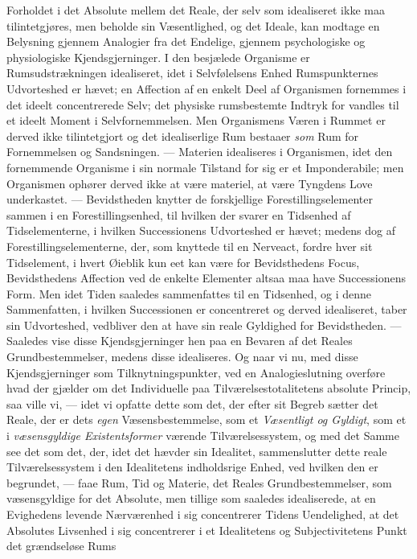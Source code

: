 Forholdet i det Absolute mellem det Reale, der selv som idealiseret ikke maa
tilintetgjøres, men beholde sin Væsentlighed, og det Ideale, kan modtage en
Belysning gjennem Analogier fra det Endelige, gjennem psychologiske og
physiologiske Kjendsgjerninger. I den besjælede Organisme er
Rumsudstrækningen idealiseret, idet i Selvfølelsens Enhed Rumspunkternes
Udvorteshed er hævet; en Affection af en enkelt Deel af Organismen fornemmes i
det ideelt concentrerede Selv; det physiske rumsbestemte Indtryk for\-%
vandles til et ideelt Moment i Selvfornemmelsen. Men Organismens Væren i Rummet
er derved ikke tilintetgjort og det idealiserlige Rum bestaaer \emph{som} Rum
for Fornemmelsen og Sandsningen. --- Materien idealiseres i Organismen, idet
den fornemmende Organisme i sin normale Tilstand for sig er et Imponderabile;
men Organismen ophører derved ikke at være materiel, at være Tyngdens Love
underkastet. --- Bevidstheden knytter de forskjellige Forestillingselementer
sammen i en Forestillingsenhed, til hvilken der svarer en Tidsenhed af
Tidselementerne, i hvilken Successionens Udvorteshed er hævet; medens dog af
Forestillingselementerne, der, som knyttede til en Nerveact, fordre hver sit
Tidselement, i hvert Øieblik kun eet kan være for Bevidsthedens Focus,
Bevidsthedens Affection ved de enkelte Elementer altsaa maa have Successionens
Form. Men idet Tiden saaledes sammenfattes til en Tidsenhed, og i denne
Sammenfatten, i hvilken Successionen er concentreret og derved idealiseret,
taber sin Udvorteshed, vedbliver den at have sin reale Gyldighed for
Bevidstheden. --- Saaledes vise disse Kjendsgjerninger hen paa en Bevaren af
det Reales Grundbestemmelser, medens disse idealiseres. Og naar vi nu, med
disse Kjendsgjerninger som Tilknytningspunkter, ved en Analogieslutning
overføre hvad der gjælder om det Individuelle paa Tilværelsestotalitetens
absolute Princip, saa ville vi, --- idet vi opfatte dette som det, der efter sit
Begreb sætter det Reale, der er dets \emph{egen} Væsensbestemmelse, som et
\emph{Væsentligt og Gyldigt}, som et i \emph{væsensgyldige Existentsformer}
værende Tilværelsessystem, og med det Samme see det som det, der, idet det
hævder sin Idealitet, sammenslutter dette reale Tilværelsessystem i den
Idealitetens indholdsrige Enhed, ved hvilken den er begrundet, --- faae Rum, Tid
og Materie, det Reales Grundbestemmelser, som væsensgyldige for det Absolute,
men tillige som saaledes idealiserede, at en Evighedens levende Nærværenhed i
sig concentrerer Tidens Uendelighed, at det Absolutes Livsenhed i sig
concentrerer i et Idealitetens og Subjectivitetens Punkt det grændseløse Rums

